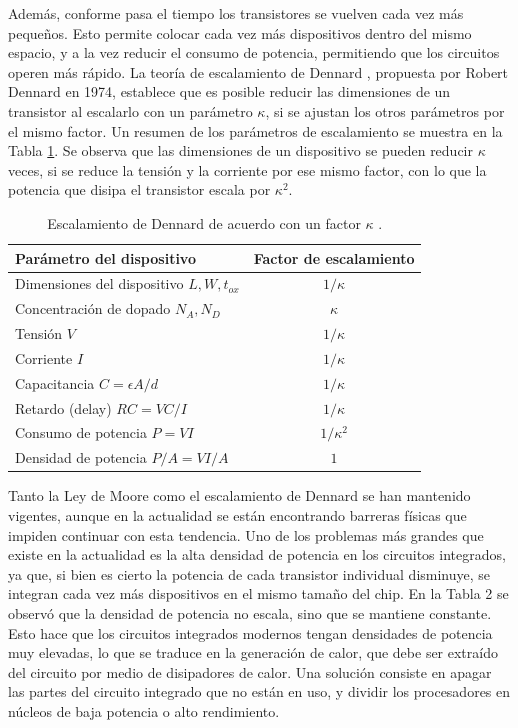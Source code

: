 Además, conforme pasa el tiempo los transistores se vuelven cada vez más pequeños. Esto permite colocar cada vez más dispositivos dentro del mismo espacio, y a la vez reducir el consumo de potencia, permitiendo que los circuitos operen más rápido. La teoría de escalamiento de Dennard \cite{dennard1974}, propuesta por Robert Dennard en 1974, establece que es posible reducir las dimensiones de un transistor al escalarlo con un parámetro $\kappa$, si se ajustan los otros parámetros por el mismo factor. Un resumen de los parámetros de escalamiento se muestra en la Tabla \ref{tabla_escalamiento_dennard}. Se observa que las dimensiones de un dispositivo se pueden reducir $\kappa$ veces, si se reduce la tensión y la corriente por ese mismo factor, con lo que la potencia que disipa el transistor escala por $\kappa^2$.

\begin{table}[H]
    \centering
    \caption{Escalamiento de Dennard de acuerdo con un factor $\kappa$ \cite{dennard1974}.}
    \label{tabla_escalamiento_dennard}
    \begin{tabular}{|l|c|}
        \hline \textbf{Parámetro del dispositivo} & \textbf{Factor de escalamiento} \\
        \hline
        Dimensiones del dispositivo $L, W, t_{ox}$ & $1/\kappa$ \\
        Concentración de dopado $N_A, N_D$         & $\kappa$   \\
        Tensión $V$                                & $1/\kappa$ \\
        Corriente $I$                              & $1/\kappa$ \\
        Capacitancia $C = \epsilon A / d$          & $1/\kappa$ \\
        Retardo (delay) $RC = VC/I$                & $1/\kappa$ \\
        Consumo de potencia $P = VI$               & $1/\kappa^2$ \\
        Densidad de potencia $P/A=VI/A$            & $1$ \\
        \hline
    \end{tabular}
\end{table}

Tanto la Ley de Moore como el escalamiento de Dennard se han mantenido vigentes, aunque en la actualidad se están encontrando barreras físicas que impiden continuar con esta tendencia. Uno de los problemas más grandes que existe en la actualidad es la alta densidad de potencia en los circuitos integrados, ya que, si bien es cierto la potencia de cada transistor individual disminuye, se integran cada vez más dispositivos en el mismo tamaño del chip. En la Tabla 2 se observó que la densidad de potencia no escala, sino que se mantiene constante. Esto hace que los circuitos integrados modernos tengan densidades de potencia muy elevadas, lo que se traduce en la generación de calor, que debe ser extraído del circuito por medio de disipadores de calor. Una solución consiste en apagar las partes del circuito integrado que no están en uso, y dividir los procesadores en núcleos de baja potencia o alto rendimiento.

